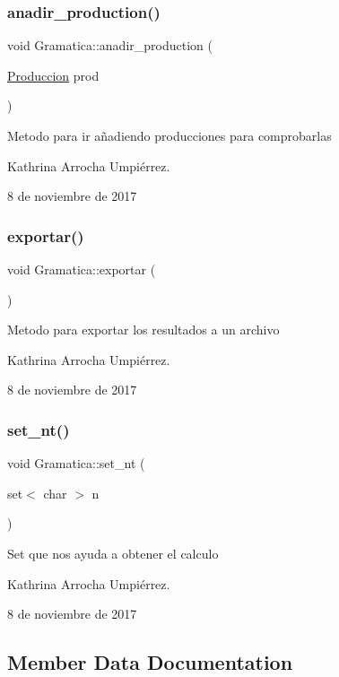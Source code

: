\subsubsection{\texorpdfstring{anadir\+\_\+production()}{anadir\_production()}}
{\footnotesize\ttfamily void Gramatica\+::anadir\+\_\+production (\begin{DoxyParamCaption}\item[{\hyperlink{class_produccion}{Produccion}}]{prod }\end{DoxyParamCaption})}

Metodo para ir añadiendo producciones para comprobarlas

Kathrina Arrocha Umpiérrez.

8 de noviembre de 2017 \mbox{\label{class_gramatica_ae18ba291a24ebcb6faff237c4eb33c29}} 
\subsubsection{\texorpdfstring{exportar()}{exportar()}}
{\footnotesize\ttfamily void Gramatica\+::exportar (\begin{DoxyParamCaption}{ }\end{DoxyParamCaption})}

Metodo para exportar los resultados a un archivo

Kathrina Arrocha Umpiérrez.

8 de noviembre de 2017 \mbox{\label{class_gramatica_ae11df05a075362d577443b8f011aa24f}} 
\subsubsection{\texorpdfstring{set\+\_\+nt()}{set\_nt()}}
{\footnotesize\ttfamily void Gramatica\+::set\+\_\+nt (\begin{DoxyParamCaption}\item[{set$<$ char $>$}]{n }\end{DoxyParamCaption})}

Set que nos ayuda a obtener el calculo

Kathrina Arrocha Umpiérrez.

8 de noviembre de 2017 

\subsection{Member Data Documentation}
\mbox{\label{class_gramatica_a538ac9ed9a10b67ab206402b326e787e}} 
